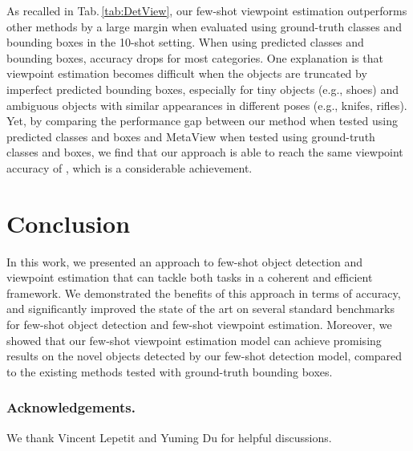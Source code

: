 \documentclass[runningheads]{llncs}
\begin{document}
As recalled in Tab.\,\ref{tab:DetView}, our few-shot viewpoint estimation outperforms other methods by a large margin when evaluated using ground-truth classes and bounding boxes in the 10-shot setting.
When using predicted classes and bounding boxes, accuracy drops for most categories.
One explanation is that viewpoint estimation becomes difficult when the objects are truncated by imperfect predicted bounding boxes, especially for tiny objects (e.g., shoes) and ambiguous objects with similar appearances in different poses (e.g., knifes, rifles).
Yet, by comparing the performance gap between our method when tested using predicted classes and boxes and MetaView when tested using ground-truth classes and boxes, we find that our approach is able to reach the same viewpoint accuracy of , which is a considerable achievement.


\section{Conclusion}

In this work, we presented an approach to few-shot object detection and viewpoint estimation that can tackle both tasks in a coherent and efficient framework.
We demonstrated the benefits of this approach in terms of accuracy, and significantly improved the state of the art on several standard benchmarks for few-shot object detection and few-shot viewpoint estimation.
Moreover, we showed that our few-shot viewpoint estimation model can achieve promising results on the novel objects detected by our few-shot detection model, compared to the existing methods tested with ground-truth bounding boxes.

\subsubsection{Acknowledgements.}
We thank Vincent Lepetit and Yuming Du for helpful discussions.


\clearpage


\end{document}
